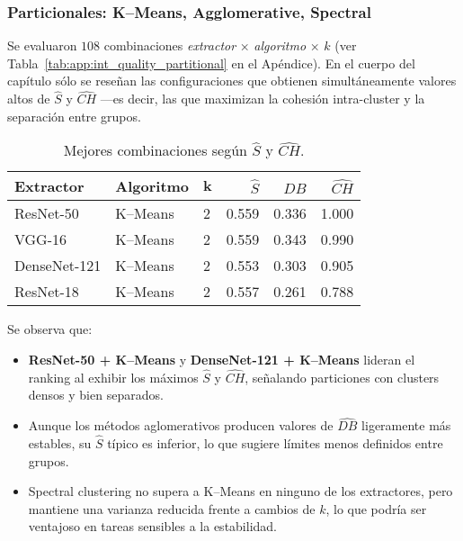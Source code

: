 \subsubsection{Particionales: K–Means, Agglomerative, Spectral}

\label{ssec:int_quality_partitional}

Se evaluaron \(108\) combinaciones
\textit{extractor} × \textit{algoritmo} × \(k\) (ver
Tabla~\ref{tab:app:int_quality_partitional} en el Apéndice).
En el cuerpo del capítulo sólo se reseñan las configuraciones que
obtienen simultáneamente valores altos de \(\widehat S\) y
\(\widehat{CH}\) —es decir, las que maximizan la cohesión intra-cluster
y la separación entre grupos.

\begin{table}[ht]
  \centering
  \caption{Mejores combinaciones según \(\widehat S\) y \(\widehat{CH}\).}
  \label{tab:int_quality_top}
  \begin{tabular}{lllrrr}
    \hline
    \textbf{Extractor} & \textbf{Algoritmo} & \(\mathbf{k}\)
      & \(\widehat S\) & \(\widehat{DB}\) & \(\widehat{CH}\) \\
    \hline
    ResNet-50    & K–Means & 2 & 0.559 & 0.336 & 1.000 \\
    VGG-16       & K–Means & 2 & 0.559 & 0.343 & 0.990 \\
    DenseNet-121 & K–Means & 2 & 0.553 & 0.303 & 0.905 \\
    ResNet-18    & K–Means & 2 & 0.557 & 0.261 & 0.788 \\
    \hline
  \end{tabular}
\end{table}

Se observa que:

\begin{itemize}
  \item \textbf{ResNet-50 + K–Means} y \textbf{DenseNet-121 + K–Means}
        lideran el ranking al exhibir los máximos
        \(\widehat S\) y \(\widehat{CH}\), señalando particiones con
        clusters densos y bien separados.
  \item Aunque los métodos aglomerativos producen valores de
        \(\widehat{DB}\) ligeramente más estables,
        su \(\widehat S\) típico es inferior,
        lo que sugiere límites menos definidos entre grupos.
  \item Spectral clustering no supera a K–Means en ninguno de los
        extractores, pero mantiene una varianza reducida frente a cambios
        de \(k\), lo que podría ser ventajoso en tareas sensibles a la
        estabilidad.
\end{itemize}

